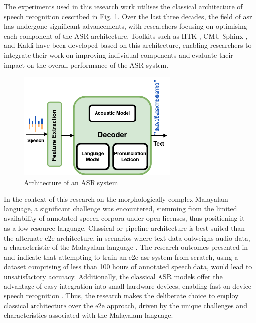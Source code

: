 The experiments used in this research work utilises the classical architecture of speech recognition described in Fig. \ref{fig:hybridASR}. Over the last three decades, the field of \gls{asr} has undergone significant advancements, with researchers focusing on optimising each component of the ASR architecture. Toolkits such as HTK \cite{young2002htk}, CMU Sphinx \cite{lee1990overview}, and Kaldi \cite{povey2011kaldi} have been developed based on this architecture, enabling researchers to integrate their work on improving individual components and evaluate their impact on the overall performance of the ASR system. 

\begin{figure}[h]
      \begin{center}
            \includegraphics[width=0.7\textwidth]{ASR.png}
            \caption{Architecture of an ASR system}
            \label{fig:hybridASR}
      \end{center}
\end{figure}

In the context of this research on the morphologically complex Malayalam language, a significant challenge was encountered, stemming from the limited availability of annotated speech corpora under open licenses, thus positioning it as a low-resource language. Classical or pipeline architecture is best suited than the alternate \gls{e2e} architecture, in 
scenarios where text data outweighs audio data, a characteristic of the Malayalam language \cite{georgescu2021performance}. The research outcomes presented in \cite{bayerl2019comparison} and \cite{aku2021specom} indicate that attempting to train an \gls{e2e} \gls{asr} system from scratch, using a dataset comprising of less than 100 hours of annotated speech data, would lead to unsatisfactory accuracy. Additionally, the classical ASR models offer the advantage of easy integration into small hardware devices, enabling fast on-device speech recognition \cite{georgescu2021performance}. Thus, the research makes the deliberate choice to employ classical architecture over the \gls{e2e} approach, driven by the unique challenges and characteristics associated with the Malayalam language.


